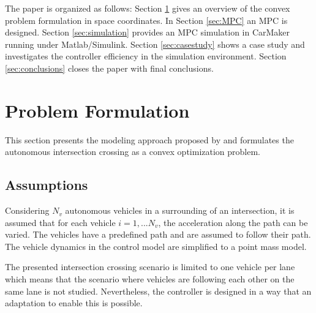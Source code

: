 \documentclass[letterpaper,10pt,conference]{ieeeconf}
\begin{document}

The paper is organized as follows: Section \ref{sec:problem_formulation} gives an overview of the convex problem formulation in space coordinates. In Section \ref{sec:MPC} an MPC is designed. Section \ref{sec:simulation} provides an MPC simulation in CarMaker running under Matlab/Simulink. Section \ref{sec:casestudy} shows a case study and investigates the controller efficiency in the simulation environment. Section \ref{sec:conclusions} closes the paper with final conclusions.

\section{Problem Formulation} \label{sec:problem_formulation}
This section presents the modeling approach proposed by \cite{nikolce} and formulates the autonomous intersection crossing as a convex optimization problem.

\subsection{Assumptions}
Considering $N_v$ autonomous vehicles in a surrounding of an intersection, it is assumed that for each vehicle $i=1,...N_v$, the acceleration along the path can be varied. The vehicles have a predefined path and are assumed to follow their path. The vehicle dynamics in the control model are simplified to a point mass model.

The presented intersection crossing scenario is limited to one vehicle per lane which means that the scenario where vehicles are following each other on the same lane is not studied. Nevertheless, the controller is designed in a way that an adaptation to enable this is possible.
\end{document}
